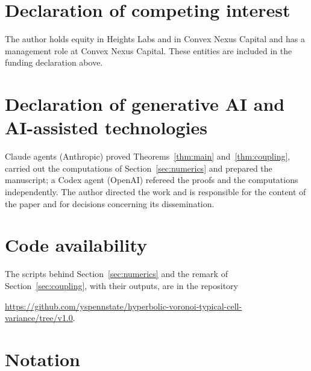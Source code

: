 \documentclass[11pt]{amsart}
\theoremstyle{remark}
\begin{document}
\section*{Declaration of competing interest}
The author holds equity in Heights Labs and in Convex Nexus Capital and has a management role at Convex Nexus Capital.
These entities are included in the funding declaration above.

\section*{Declaration of generative AI and AI-assisted technologies}
Claude agents (Anthropic) proved Theorems~\ref{thm:main} and~\ref{thm:coupling}, carried out the computations of
Section~\ref{sec:numerics} and prepared the manuscript; a Codex agent (OpenAI) refereed the proofs and the computations independently.
The author directed the work and is responsible for the content of the paper and for decisions concerning its
dissemination.

\section*{Code availability}
The scripts behind Section~\ref{sec:numerics} and the remark of Section~\ref{sec:coupling}, with their outputs, are in
the repository
\begin{center}\url{https://github.com/yspennstate/hyperbolic-voronoi-typical-cell-variance/tree/v1.0}.\end{center}

\appendix
\section{Notation}\label{app:notation}
\end{document}
